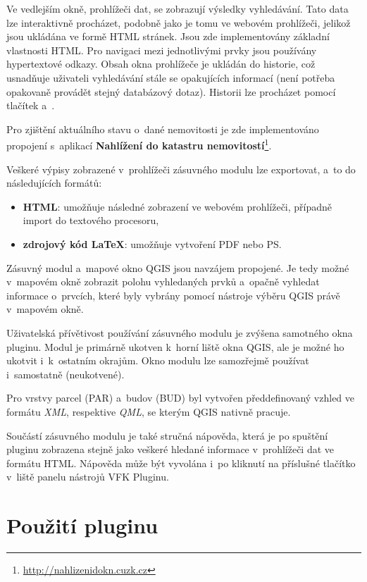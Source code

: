 \documentclass[a4paper,12pt,oneside]{book}
\newcommand{\latex}{\LaTeX}
\begin{document}
Ve vedlejším okně, prohlížeči dat, se zobrazují výsledky
vyhledávání. Tato data lze interaktivně procházet, podobně jako je
tomu ve webovém prohlížeči, jelikož jsou ukládána ve formě HTML
stránek. Jsou zde implementovány základní vlastnosti HTML. Pro
navigaci mezi jednotlivými prvky jsou používány hypertextové
odkazy. Obsah okna prohlížeče je ukládán do historie, což usnadňuje
uživateli vyhledávání stále se opakujících informací (není potřeba
opakovaně provádět stejný databázový dotaz). Historii lze procházet
pomocí tlačítek  a~.

Pro zjištění aktuálního stavu o~dané nemovitosti je zde implementováno
propojení s~aplikací \textbf{Nahlížení do katastru
  nemovitostí}\footnote{\url{http://nahlizenidokn.cuzk.cz}}.

Veškeré výpisy zobrazené v~prohlížeči zásuvného modulu lze exportovat,
a~to do následujících formátů:

\begin{itemize}
 \item \textbf{HTML}: umožňuje následné zobrazení ve webovém prohlížeči, případně import do textového procesoru,
 \item \textbf{zdrojový kód \latex}: umožňuje vytvoření PDF nebo PS.
\end{itemize}

Zásuvný modul a~mapové okno QGIS jsou navzájem propojené. Je tedy
možné v~mapovém okně zobrazit polohu vyhledaných prvků a~opačně
vyhledat informace o~prvcích, které byly vybrány pomocí nástroje
výběru QGIS právě v~mapovém okně.

Uživatelská přívětivost používání zásuvného modulu je zvýšena
 samotného okna pluginu. Modul je primárně ukotven
k~horní liště okna QGIS, ale je možné ho ukotvit i~k~ostatním
okrajům. Okno modulu lze samozřejmě používat i~samostatně
(neukotvené).

Pro vrstvy parcel (PAR) a~budov (BUD) byl vytvořen
předdefinovaný vzhled ve formátu \textit{XML}, respektive
\textit{QML}, se kterým QGIS nativně pracuje.

Součástí zásuvného modulu je také stručná nápověda, která je po
spuštění pluginu zobrazena stejně jako veškeré hledané informace
v~prohlížeči dat ve formátu HTML. Nápověda může být vyvolána i~po
kliknutí na příslušné tlačítko v~liště panelu nástrojů VFK
Pluginu.

\newpage
\section{Použití pluginu}
\end{document}
